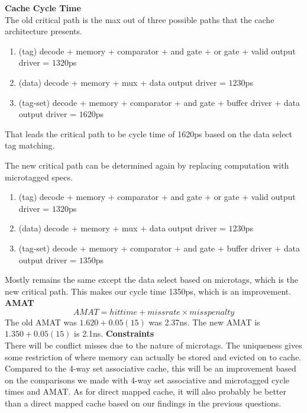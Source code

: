 \documentclass[11pt]{article}
\begin{document}
\begin{Parts}
	\Part \textbf{Cache Cycle Time} \\
		The old critical path is the max out of three possible paths that the cache architecture presents. 
		\begin{enumerate}[i]
			\item (tag) decode + memory + comparator + and gate + or gate + valid output driver = $1320$ps
			\item (data) decode + memory + mux + data output driver = $1230$ps
			\item (tag-set) decode + memory + comparator + and gate + buffer driver + data output driver = $1620$ps
		\end{enumerate}
		
		That leads the critical path to be cycle time of 1620ps based on the data select tag matching.
		
		The new critical path can be determined again by replacing computation with microtagged specs. 
		\begin{enumerate}[i]
			\item (tag) decode + memory + comparator + and gate + or gate + valid output driver = $1320$ps
			\item (data) decode + memory + mux + data output driver = $1230$ps
			\item (tag-set) decode + memory + comparator + and gate + buffer driver + data output driver = $1350$ps
		\end{enumerate}
		
		Mostly remains the same except the data select based on microtags, which is the new critical path. This makes our cycle time 1350ps, which is an improvement.
	\Part \textbf{AMAT} \\
		$$AMAT = hit time + miss rate \times miss penalty$$
		The old AMAT was $1.620 + 0.05(15)$ was 2.37ns.
		The new AMAT is $1.350 + 0.05(15)$ is 2.1ns.
	\Part \textbf{Constraints} \\
		There will be conflict misses due to the nature of microtags. The uniqueness gives some restriction of where memory can actually be stored and evicted on to cache. Compared to the 4-way set associative cache, this will be an improvement based on the comparisons we made with 4-way set associative and microtagged cycle times and AMAT. As for direct mapped cache, it will also probably be better than a direct mapped cache based on our findings in the previous questions. 
\end{Parts}
\newpage
\end{document}
